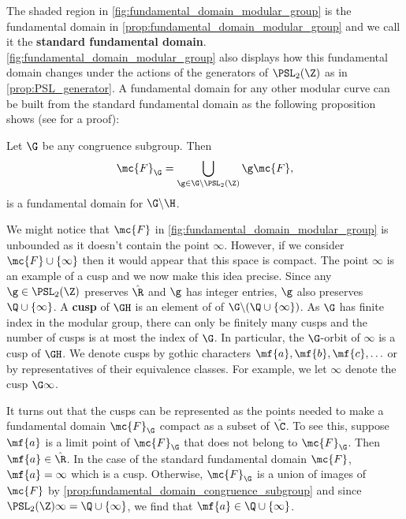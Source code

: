       The shaded region in \cref{fig:fundamental_domain_modular_group} is the fundamental domain in \cref{prop:fundamental_domain_modular_group} and we call it the \textbf{standard fundamental domain}. \cref{fig:fundamental_domain_modular_group} also displays how this fundamental domain changes under the actions of the generators of $\PSL_{2}(\Z)$ as in \cref{prop:PSL_generator}. A fundamental domain for any other modular curve can be built from the standard fundamental domain as the following proposition shows (see \cite{kilford2015modular} for a proof):

      \begin{proposition}\label{prop:fundamental_domain_congruence_subgroup}
        Let $\G$ be any congruence subgroup. Then
        \[
          \mc{F}_{\G} = \bigcup_{\g \in \G\backslash\PSL_{2}(\Z)}\g\mc{F},
        \]
        is a fundamental domain for $\G\backslash\H$.
      \end{proposition}

      We might notice that $\mc{F}$ in \cref{fig:fundamental_domain_modular_group} is unbounded as it doesn't contain the point $\infty$. However, if we consider $\mc{F} \cup \{\infty\}$ then it would appear that this space is compact. The point $\infty$ is an example of a cusp and we now make this idea precise. Since any $\g \in \PSL_{2}(\Z)$ preserves $\hat{\R}$ and $\g$ has integer entries, $\g$ also preserves $\Q \cup \{\infty\}$. A \textbf{cusp} of $\GH$ is an element of of $\G\backslash(\Q \cup \{\infty\})$. As $\G$ has finite index in the modular group, there can only be finitely many cusps and the number of cusps is at most the index of $\G$. In particular, the $\G$-orbit of $\infty$ is a cusp of $\GH$. We denote cusps by gothic characters $\mf{a},\mf{b},\mf{c},\ldots$ or by representatives of their equivalence classes. For example, we let $\infty$ denote the cusp $\G\infty$.

      \begin{remark}
        It turns out that the cusps can be represented as the points needed to make a fundamental domain $\mc{F}_{\G}$ compact as a subset of $\hat{\C}$. To see this, suppose $\mf{a}$ is a limit point of $\mc{F}_{\G}$ that does not belong to $\mc{F}_{\G}$. Then $\mf{a} \in \hat{\R}$. In the case of the standard fundamental domain $\mc{F}$, $\mf{a} = \infty$ which is a cusp. Otherwise, $\mc{F}_{\G}$ is a union of images of $\mc{F}$ by \cref{prop:fundamental_domain_congruence_subgroup} and since $\PSL_{2}(\Z)\infty = \Q \cup \{\infty\}$, we find that $\mf{a} \in \Q \cup \{\infty\}$.
      \end{remark}

